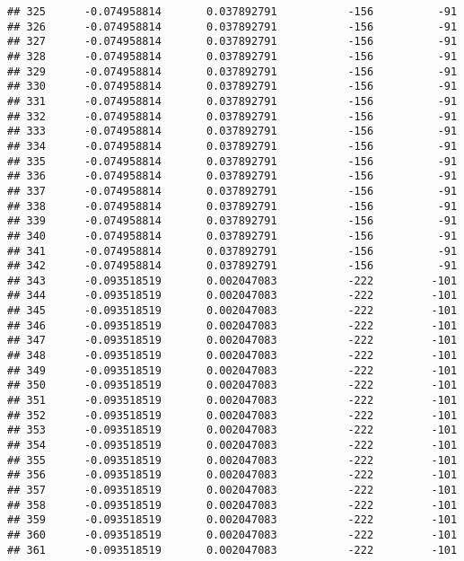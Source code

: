 \documentclass[]{article}
\begin{document}
\begin{verbatim}
## 325      -0.074958814       0.037892791           -156          -91
## 326      -0.074958814       0.037892791           -156          -91
## 327      -0.074958814       0.037892791           -156          -91
## 328      -0.074958814       0.037892791           -156          -91
## 329      -0.074958814       0.037892791           -156          -91
## 330      -0.074958814       0.037892791           -156          -91
## 331      -0.074958814       0.037892791           -156          -91
## 332      -0.074958814       0.037892791           -156          -91
## 333      -0.074958814       0.037892791           -156          -91
## 334      -0.074958814       0.037892791           -156          -91
## 335      -0.074958814       0.037892791           -156          -91
## 336      -0.074958814       0.037892791           -156          -91
## 337      -0.074958814       0.037892791           -156          -91
## 338      -0.074958814       0.037892791           -156          -91
## 339      -0.074958814       0.037892791           -156          -91
## 340      -0.074958814       0.037892791           -156          -91
## 341      -0.074958814       0.037892791           -156          -91
## 342      -0.074958814       0.037892791           -156          -91
## 343      -0.093518519       0.002047083           -222         -101
## 344      -0.093518519       0.002047083           -222         -101
## 345      -0.093518519       0.002047083           -222         -101
## 346      -0.093518519       0.002047083           -222         -101
## 347      -0.093518519       0.002047083           -222         -101
## 348      -0.093518519       0.002047083           -222         -101
## 349      -0.093518519       0.002047083           -222         -101
## 350      -0.093518519       0.002047083           -222         -101
## 351      -0.093518519       0.002047083           -222         -101
## 352      -0.093518519       0.002047083           -222         -101
## 353      -0.093518519       0.002047083           -222         -101
## 354      -0.093518519       0.002047083           -222         -101
## 355      -0.093518519       0.002047083           -222         -101
## 356      -0.093518519       0.002047083           -222         -101
## 357      -0.093518519       0.002047083           -222         -101
## 358      -0.093518519       0.002047083           -222         -101
## 359      -0.093518519       0.002047083           -222         -101
## 360      -0.093518519       0.002047083           -222         -101
## 361      -0.093518519       0.002047083           -222         -101

\end{verbatim}
\end{document}
